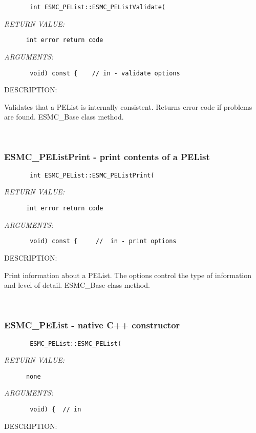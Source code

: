   
\begin{verbatim}       int ESMC_PEList::ESMC_PEListValidate(\end{verbatim}{\em RETURN VALUE:}
\begin{verbatim}      int error return code\end{verbatim}{\em ARGUMENTS:}
\begin{verbatim}       void) const {    // in - validate options\end{verbatim}
{\sf DESCRIPTION:\\ }


        Validates that a PEList is internally consistent.
        Returns error code if problems are found.  ESMC\_Base class method.
   
 
\mbox{}\hrulefill\ 
 
\subsubsection{ESMC\_PEListPrint - print contents of a PEList}


  
\begin{verbatim}       int ESMC_PEList::ESMC_PEListPrint(\end{verbatim}{\em RETURN VALUE:}
\begin{verbatim}      int error return code\end{verbatim}{\em ARGUMENTS:}
\begin{verbatim}       void) const {     //  in - print options\end{verbatim}
{\sf DESCRIPTION:\\ }


        Print information about a PEList.  The options control the
        type of information and level of detail.  ESMC\_Base class method.
   
 
\mbox{}\hrulefill\ 
 
\subsubsection{ESMC\_PEList - native C++ constructor}


  
\begin{verbatim}       ESMC_PEList::ESMC_PEList(\end{verbatim}{\em RETURN VALUE:}
\begin{verbatim}      none\end{verbatim}{\em ARGUMENTS:}
\begin{verbatim}       void) {  // in\end{verbatim}
{\sf DESCRIPTION:\\ }


